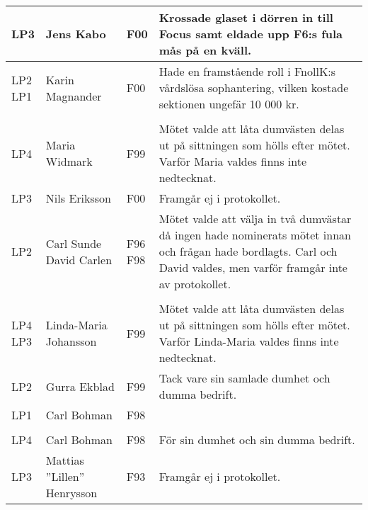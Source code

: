 \documentclass[a4paper]{article}
\begin{document}
\begin{longtable}{p{5mm}>{\raggedright\arraybackslash}p{30mm}p{10mm}p{108mm}}
LP3 & Jens Kabo & F00 & Krossade glaset i dörren in till Focus samt eldade upp F6:s fula mås på en kväll. \\ \hline

\makecell{LP2 \\ LP1} & Karin Magnander & F00 & Hade en framstående roll i FnollK:s vårdslösa sophantering, vilken kostade sektionen ungefär 10 000 kr. \\ \hline

\rowcolor{veryLightGray} \multicolumn{4}{l}{\textbf{2000/2001}} \\ \hline

LP4 & Maria Widmark & F99 & Mötet valde att låta dumvästen delas ut på sittningen som hölls efter mötet. Varför Maria valdes finns inte nedtecknat. \\ \hline

LP3 & Nils Eriksson & F00 & Framgår ej i protokollet. \\ \hline

LP2 & \makecell{Carl Sunde \\ David Carlen} & \makecell{F96 \\ F98} & Mötet valde att välja in två dumvästar då ingen hade nominerats mötet innan och frågan hade bordlagts. Carl och David valdes, men varför framgår inte av protokollet. \\ \hline

\rowcolor{veryLightGray} \multicolumn{4}{l}{\textbf{1999/2000}} \\ \hline

\makecell{LP4 \\ LP3} & Linda-Maria Johansson & F99 & Mötet valde att låta dumvästen delas ut på sittningen som hölls efter mötet. Varför Linda-Maria valdes finns inte nedtecknat. \\ \hline

LP2 & Gurra Ekblad & F99 & Tack vare sin samlade dumhet och dumma bedrift. \\ \hline

LP1 & Carl Bohman & F98 & \\ \hline

\rowcolor{veryLightGray} \multicolumn{4}{l}{\textbf{1998/1999}} \\ \hline

LP4 & Carl Bohman & F98 & För sin dumhet och sin dumma bedrift. \\ \hline

LP3 & Mattias ''Lillen'' Henrysson & F93 & Framgår ej i protokollet. \\ \hline


\end{longtable}
\end{document}
